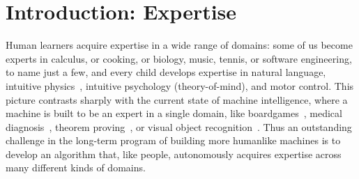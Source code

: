 \documentclass{article}
\newcommand{\system}{\textsc{DreamCoder}~}
\begin{document}

\section{Introduction: Expertise}

Human learners acquire expertise in a wide range of domains: some of
us become experts in calculus, or cooking, or biology, music, tennis,
or software engineering, to name just a few, and every child develops
expertise in natural language, intuitive physics~\cite{Pete?},
intuitive psychology (theory-of-mind), and motor control.  This
picture contrasts sharply with the current state of machine
intelligence, where a machine is built to be an expert in a single
domain, like boardgames~\cite{alphaGo}, medical
diagnosis~\cite{mycin,CNNsForDiseaseDetection}, theorem
proving~\cite{eurisko}, or visual object recognition~\cite{alexNet}.
Thus an outstanding challenge in the long-term program of building
more humanlike machines is to develop an algorithm that, like people,
autonomously acquires expertise across many different kinds of
domains.
\end{document}
